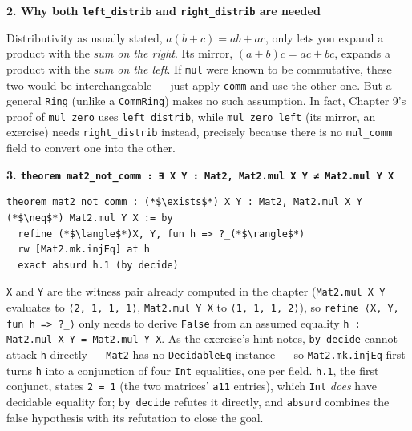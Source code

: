 \textbf{2. Why both \texttt{left\_\allowbreak{}distrib} and \texttt{right\_\allowbreak{}distrib} are needed}

Distributivity as usually stated, \(a(b+c) = ab+ac\), only lets you expand a product with the \emph{sum on the right}. Its mirror, \((a+b)c = ac+bc\), expands a product with the \emph{sum on the left}. If \texttt{mul} were known to be commutative, these two would be interchangeable --- just apply \texttt{comm} and use the other one. But a general \texttt{Ring} (unlike a \texttt{CommRing}) makes no such assumption. In fact, Chapter 9's proof of \texttt{mul\_\allowbreak{}zero} uses \texttt{left\_\allowbreak{}distrib}, while \texttt{mul\_\allowbreak{}zero\_\allowbreak{}left} (its mirror, an exercise) needs \texttt{right\_\allowbreak{}distrib} instead, precisely because there is no \texttt{mul\_\allowbreak{}comm} field to convert one into the other.

\textbf{3. \texttt{theorem mat2\_\allowbreak{}not\_\allowbreak{}comm : ∃ X Y : Mat2, Mat2.mul X Y ≠ Mat2.mul Y X}}

\begin{lstlisting}
theorem mat2_not_comm : (*$\exists$*) X Y : Mat2, Mat2.mul X Y (*$\neq$*) Mat2.mul Y X := by
  refine (*$\langle$*)X, Y, fun h => ?_(*$\rangle$*)
  rw [Mat2.mk.injEq] at h
  exact absurd h.1 (by decide)
\end{lstlisting}

\texttt{X} and \texttt{Y} are the witness pair already computed in the chapter (\texttt{Mat2.mul X Y} evaluates to \texttt{⟨2, 1, 1, 1⟩}, \texttt{Mat2.mul Y X} to \texttt{⟨1, 1, 1, 2⟩}), so \texttt{refine ⟨X, Y, fun h => ?\_\allowbreak{}⟩} only needs to derive \texttt{False} from an assumed equality \texttt{h : Mat2.mul X Y = Mat2.mul Y X}. As the exercise's hint notes, \texttt{by decide} cannot attack \texttt{h} directly --- \texttt{Mat2} has no \texttt{DecidableEq} instance --- so \texttt{Mat2.mk.injEq} first turns \texttt{h} into a conjunction of four \texttt{Int} equalities, one per field. \texttt{h.1}, the first conjunct, states \texttt{2 = 1} (the two matrices' \texttt{a11} entries), which \texttt{Int} \emph{does} have decidable equality for; \texttt{by decide} refutes it directly, and \texttt{absurd} combines the false hypothesis with its refutation to close the goal.
